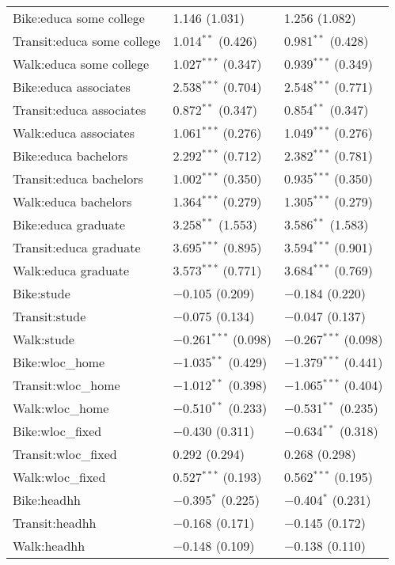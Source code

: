 \begin{longtabu}{lll}
 Bike:educa some college & 1.146 (1.031) & 1.256 (1.082) \\ 
 Transit:educa some college & 1.014$^{**}$ (0.426) & 0.981$^{**}$ (0.428) \\ 
 Walk:educa some college & 1.027$^{***}$ (0.347) & 0.939$^{***}$ (0.349) \\ 
 Bike:educa associates & 2.538$^{***}$ (0.704) & 2.548$^{***}$ (0.771) \\ 
 Transit:educa associates & 0.872$^{**}$ (0.347) & 0.854$^{**}$ (0.347) \\ 
 Walk:educa associates & 1.061$^{***}$ (0.276) & 1.049$^{***}$ (0.276) \\ 
 Bike:educa bachelors & 2.292$^{***}$ (0.712) & 2.382$^{***}$ (0.781) \\ 
 Transit:educa bachelors & 1.002$^{***}$ (0.350) & 0.935$^{***}$ (0.350) \\ 
 Walk:educa bachelors & 1.364$^{***}$ (0.279) & 1.305$^{***}$ (0.279) \\ 
 Bike:educa graduate & 3.258$^{**}$ (1.553) & 3.586$^{**}$ (1.583) \\ 
 Transit:educa graduate & 3.695$^{***}$ (0.895) & 3.594$^{***}$ (0.901) \\ 
 Walk:educa graduate & 3.573$^{***}$ (0.771) & 3.684$^{***}$ (0.769) \\ 
 Bike:stude & $-$0.105 (0.209) & $-$0.184 (0.220) \\ 
 Transit:stude & $-$0.075 (0.134) & $-$0.047 (0.137) \\ 
 Walk:stude & $-$0.261$^{***}$ (0.098) & $-$0.267$^{***}$ (0.098) \\ 
 Bike:wloc\_home & $-$1.035$^{**}$ (0.429) & $-$1.379$^{***}$ (0.441) \\ 
 Transit:wloc\_home & $-$1.012$^{**}$ (0.398) & $-$1.065$^{***}$ (0.404) \\ 
 Walk:wloc\_home & $-$0.510$^{**}$ (0.233) & $-$0.531$^{**}$ (0.235) \\ 
 Bike:wloc\_fixed & $-$0.430 (0.311) & $-$0.634$^{**}$ (0.318) \\ 
 Transit:wloc\_fixed & 0.292 (0.294) & 0.268 (0.298) \\ 
 Walk:wloc\_fixed & 0.527$^{***}$ (0.193) & 0.562$^{***}$ (0.195) \\ 
 Bike:headhh & $-$0.395$^{*}$ (0.225) & $-$0.404$^{*}$ (0.231) \\ 
 Transit:headhh & $-$0.168 (0.171) & $-$0.145 (0.172) \\ 
 Walk:headhh & $-$0.148 (0.109) & $-$0.138 (0.110) \\ 

\end{longtabu}
